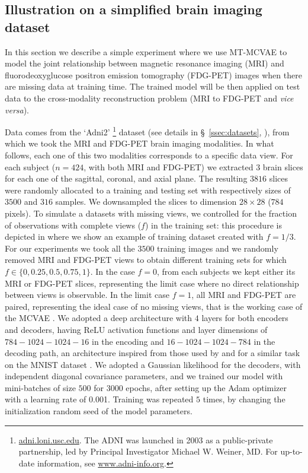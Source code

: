\subsection{Illustration on a simplified brain imaging dataset}
\label{sec:proof_of_concept}

In this section we describe a simple experiment where we use MT-MCVAE to model the joint relationship between
magnetic resonance imaging (MRI) and fluorodeoxyglucose positron emission tomography (FDG-PET) images when there are missing data at training time.
The trained model will be then applied on test data
to the cross-modality reconstruction problem (MRI to FDG-PET and \textit{vice versa}).

Data comes from the `Adni2'
\footnote{
\href{http://adni.loni.usc.edu}{adni.loni.usc.edu}.
The ADNI was launched in 2003 as a public-private partnership, led by Principal Investigator Michael W. Weiner, MD. For up-to-date information, see \href{www.adni-info.org}{www.adni-info.org}.
}
dataset (see details in \S~\ref{ssec:datasets}, ), from which we took the MRI and FDG-PET brain imaging modalities.
In what follows, each one of this two modalities corresponds to a specific data view.
For each subject ($n=424$, with both MRI and FDG-PET) we extracted $3$ brain slices for each one of the sagittal, coronal, and axial plane.
The resulting $3816$ slices were randomly allocated to a training and testing set with respectively sizes of $3500$ and $316$ samples.
We downsampled the slices to dimension $28 \times 28$ ($784$ pixels).
%
To simulate a datasets with missing views, we controlled for the fraction of observations with complete views ($f$) in the training set:
this procedure is depicted in  where we show an example of training dataset created with $f=1/3$.
%
For our experiments we took all the $3500$ training images and we randomly removed MRI and FDG-PET views to obtain different training sets for which $f \in \{0, 0.25, 0.5, 0.75, 1\}$.
In the case $f = 0$, from each subjects we kept either its MRI or FDG-PET slices, representing the limit case where no direct relationship between views is observable.
In the limit case $f = 1$, all MRI and FDG-PET are paired, representing the ideal case of no missing views, that is the working case of the MCVAE \citep{Antelmi2019}.
We adopted a deep architecture with $4$ layers for both encoders and decoders, having ReLU activation functions and layer dimensions of $784-1024-1024-16$ in the encoding and $16-1024-1024-784$ in the decoding path,
an architecture inspired from those used by \cite{dcca1} and \cite{dcca2} for a similar task on the MNIST dataset \citep{mnist}.
We adopted a Gaussian likelihood for the decoders, with independent diagonal covariance parameters, and we trained our model with mini-batches of size $500$ for $3000$ epochs, after setting up the Adam optimizer with a learning rate of 0.001.
Training was repeated $5$ times, by changing the initialization random seed of the model parameters.

